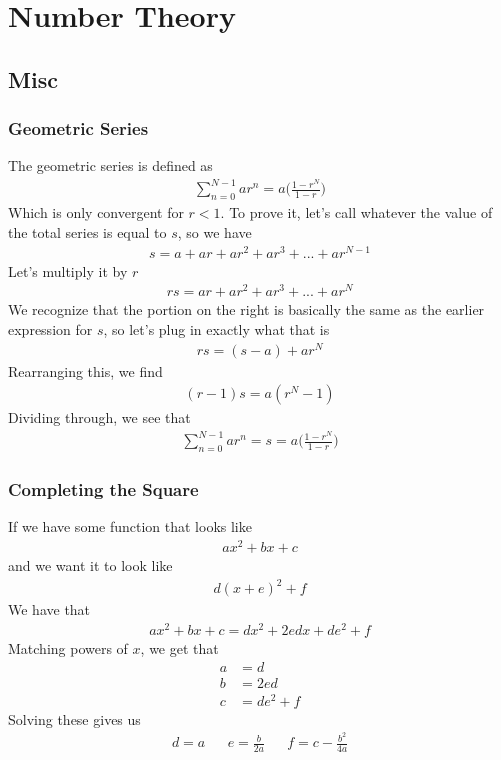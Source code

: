 \chapter{Number Theory}
\section{Misc}

\subsection{Geometric Series}
The geometric series is defined as 
\begin{align}
	\sum_{n=0}^{N-1} ar^n =a\Big( \frac{1-r^{N}}{1-r}\Big)
\end{align}
Which is only convergent for $r < 1$. To prove it, let's call whatever the value of the total series is equal to $s$, so we have
\begin{align}
	s = a + ar + ar^2 + ar^3 + ... + ar^{N-1}
\end{align}
Let's multiply it by $r$
\begin{align}
	rs =  ar + ar^2 + ar^3 + ... + ar^{N}
\end{align}
We recognize that the portion on the right is basically the same as the earlier expression for $s$, so let's plug in exactly what that is
\begin{align}
	rs = (s - a) + ar^N
\end{align}
Rearranging this, we find
\begin{align}
	(r-1)s = a(r^N - 1)
\end{align}
Dividing through, we see that
\begin{align}
	\sum_{n=0}^{N-1} ar^n = s = a\Big( \frac{1-r^{N}}{1-r}\Big)
\end{align}


\subsection{Completing the Square}
If we have some function that looks like
\begin{align}
ax^2 + bx + c
\end{align}
and we want it to look like
\begin{align}
d(x+e)^2 + f
\end{align}
We have that 
\begin{align}
ax^2 + bx + c = dx^2 + 2ed x + de^2 + f
\end{align}
Matching powers of $x$, we get that
\begin{align}
a &= d\\
b &= 2ed\\
c &= de^2+f
\end{align}
Solving these gives us
\begin{align}
d = a && e =\frac{b}{2a}  && f = c-\frac{b^2}{4a}
\end{align}




